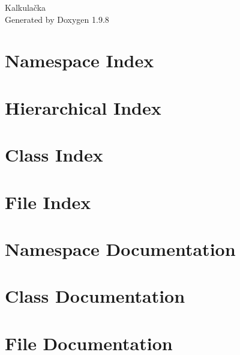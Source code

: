 \documentclass[twoside]{book}
\newcommand{\+}{\discretionary{\mbox{\scriptsize$\hookleftarrow$}}{}{}}
\newcommand{\clearemptydoublepage}{%
    \newpage{\pagestyle{empty}\cleardoublepage}%
  }
\begin{document}
  \raggedbottom
    \hypersetup{pageanchor=false,
                bookmarksnumbered=true,
                pdfencoding=unicode
               }
  \begin{titlepage}
  \vspace*{7cm}
  \begin{center}%
  {\Large Kalkulačka}\\
  \vspace*{1cm}
  {\large Generated by Doxygen 1.9.8}\\
  \end{center}
  \end{titlepage}
  \clearemptydoublepage
  \tableofcontents
  \clearemptydoublepage
  \hypersetup{pageanchor=true}
\chapter{Namespace Index}

\chapter{Hierarchical Index}

\chapter{Class Index}

\chapter{File Index}

\chapter{Namespace Documentation}








\chapter{Class Documentation}






\chapter{File Documentation}








  \backmatter
  \newpage
  \clearemptydoublepage
  \printindex
\end{document}
